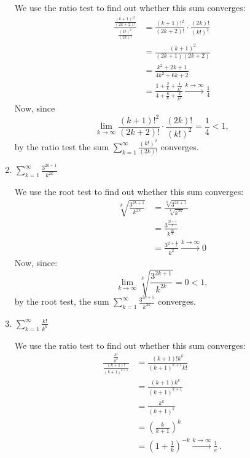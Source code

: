 \documentclass[week=6]{homework}
\begin{document}
\begin{questions}
\begin{enumerate}[label=(\alph*)]
		    We use the ratio test to find out whether this sum converges:
		    \begin{align*}
		    	\frac{\frac{(k+1)!^2}{(2k+2)!}}{\frac{(k!)^2}{(2k)!}} &= \frac{(k+1)!^2}{(2k+2)!} \cdot \frac{(2k)!}{(k!)^2} \\
		    	&= \frac{(k+1)^2}{(2k+1)(2k+2)} \\
		    	&= \frac{k^2 + 2k + 1}{4k^2 + 6k + 2} \\
		    	&= \frac{1 + \frac{2}{k} + \frac{1}{k^2}}{4 + \frac{6}{k} + \frac{2}{k^2}} \xrightarrow{k \to \infty} \frac{1}{4}
		    \end{align*}
		    Now, since 
		    \[
		    \lim_{k \to \infty} \frac{(k+1)!^2}{(2k+2)!} \cdot \frac{(2k)!}{(k!)^2} = \frac{1}{4} < 1,
		    \]
		    by the ratio test the sum $\sum_{k=1}^{\infty} \frac{(k!)^2}{(2k)!}$ converges. 
	    	
	    	\addtocounter{enumi}{2}
	    	\item $\displaystyle \sum_{k=1}^{\infty} \frac{3^{2k+1}}{k^{2k}}$
	    	
	    	We use the root test to find out whether this sum converges:
	    	\begin{align*}
	    		\sqrt[k]{\frac{3^{2k+1}}{k^{2k}}} &=  \frac{\sqrt[k]{3^{2k+1}}}{\sqrt[k]{k^{2k}}} \\
	    		&= \frac{3^{\frac{2k+1}{k}}}{k^{\frac{2k}{k}}} \\
	    		&= \frac{3^{2 + \frac{1}{k}}}{k^2} \xrightarrow{k \to \infty} 0
	    	\end{align*}
	    	Now, since:
	    	\[
		    	\lim_{k \to \infty} \sqrt[k]{\frac{3^{2k+1}}{k^{2k}}} = 0 < 1,
	    	\]
	    	by the root test, the sum $ \sum_{k=1}^{\infty} \frac{3^{2k+1}}{k^{2k}}$ converges. 
	    	
	    	\addtocounter{enumi}{1}
	    	\item $\displaystyle \sum_{k=1}^{\infty} \frac{k!}{k^k}$
	    	
	    	We use the ratio test to find out whether this sum converges:
	    	\begin{align*}
	    		\frac{\frac{k!}{k^k}}{\frac{(k+1)!}{(k+1)^{k+1}}} &= \frac{(k+1)!k^k}{(k+1)^{k+1}k!} \\
	    		&= \frac{(k+1)k^k}{(k+1)^{k+1}} \\
	    		&= \frac{k^k}{(k+1)^k} \\
	    		&= \left(\frac{k}{k+1}\right)^k \\
	    		&= \left(1 + \frac{1}{k}\right)^{-k} \xrightarrow{k \to \infty} \frac{1}{e}\,.
	    	\end{align*}
	    	

\end{enumerate}
\end{questions}
\end{document}
